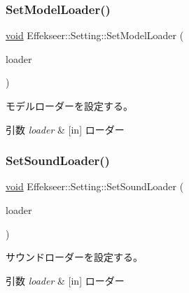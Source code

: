 \subsubsection{\texorpdfstring{Set\+Model\+Loader()}{SetModelLoader()}}
{\footnotesize\ttfamily \mbox{\hyperlink{namespace_effekseer_ab34c4088e512200cf4c2716f168deb56}{void}} Effekseer\+::\+Setting\+::\+Set\+Model\+Loader (\begin{DoxyParamCaption}\item[{\mbox{\hyperlink{class_effekseer_1_1_model_loader}{Model\+Loader}} $\ast$}]{loader }\end{DoxyParamCaption})}



モデルローダーを設定する。 


\begin{DoxyParams}{引数}
{\em loader} & \mbox{[}in\mbox{]} ローダー \\
\hline
\end{DoxyParams}
\mbox{\label{class_effekseer_1_1_setting_a7f383e108785141004f9ed4008ae6b20}} 
\subsubsection{\texorpdfstring{Set\+Sound\+Loader()}{SetSoundLoader()}}
{\footnotesize\ttfamily \mbox{\hyperlink{namespace_effekseer_ab34c4088e512200cf4c2716f168deb56}{void}} Effekseer\+::\+Setting\+::\+Set\+Sound\+Loader (\begin{DoxyParamCaption}\item[{\mbox{\hyperlink{class_effekseer_1_1_sound_loader}{Sound\+Loader}} $\ast$}]{loader }\end{DoxyParamCaption})}



サウンドローダーを設定する。 


\begin{DoxyParams}{引数}
{\em loader} & \mbox{[}in\mbox{]} ローダー \\
\hline
\end{DoxyParams}
\mbox{\label{class_effekseer_1_1_setting_a0475d684fcef475fae8250d8b43a5ffc}} 
